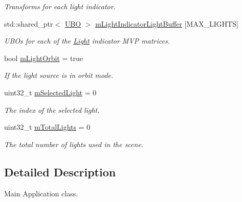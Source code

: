\begin{DoxyCompactItemize}
\begin{DoxyCompactList}\small\item\em Transforms for each light indicator. \end{DoxyCompactList}\item 
\mbox{\label{class_vk_app_affbae41c27d18335e67dc939bf69f123}} 
std\+::shared\+\_\+ptr$<$ \mbox{\hyperlink{struct_u_b_o}{U\+BO}} $>$ \mbox{\hyperlink{class_vk_app_affbae41c27d18335e67dc939bf69f123}{m\+Light\+Indicator\+Light\+Buffer}} \mbox{[}M\+A\+X\+\_\+\+L\+I\+G\+H\+TS\mbox{]}
\begin{DoxyCompactList}\small\item\em U\+B\+Os for each of the \mbox{\hyperlink{struct_light}{Light}} indicator M\+VP matrices. \end{DoxyCompactList}\item 
\mbox{\label{class_vk_app_ade4033211b5afdbe2ffbabbbe881ec9f}} 
bool \mbox{\hyperlink{class_vk_app_ade4033211b5afdbe2ffbabbbe881ec9f}{m\+Light\+Orbit}} = true
\begin{DoxyCompactList}\small\item\em If the light source is in orbit mode. \end{DoxyCompactList}\item 
\mbox{\label{class_vk_app_a50483139f52894d3583aacd62222d716}} 
uint32\+\_\+t \mbox{\hyperlink{class_vk_app_a50483139f52894d3583aacd62222d716}{m\+Selected\+Light}} = 0
\begin{DoxyCompactList}\small\item\em The index of the selected light. \end{DoxyCompactList}\item 
\mbox{\label{class_vk_app_a02576dbbd682724706ea51c4e47c663f}} 
uint32\+\_\+t \mbox{\hyperlink{class_vk_app_a02576dbbd682724706ea51c4e47c663f}{m\+Total\+Lights}} = 0
\begin{DoxyCompactList}\small\item\em The total number of lights used in the scene. \end{DoxyCompactList}\end{DoxyCompactItemize}


\subsection{Detailed Description}
Main Application class. 

